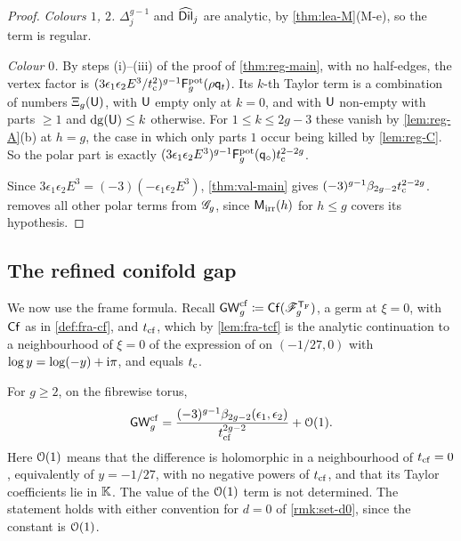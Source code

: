 \begin{proof}
\emph{Colours $1$, $2$.} $\Delta_j^{g-1}$ and $\widehat{\mathsf{Dil}}_j$ are analytic, by \cref{thm:lea-M}(M-e), so the term is regular.

\emph{Colour $0$.} By steps (i)--(iii) of the proof of \cref{thm:reg-main}, with no half-edges, the vertex factor is $(3\epsilon_1\epsilon_2E^3/t_{\mathrm{c}}^2)^{g-1}\mathsf{F}^{\mathrm{pot}}_g(\rho\mathsf{q}_{t})$. Its $k$-th Taylor term is a combination of numbers $\Xi_g(\mathsf{U})$, with $\mathsf{U}$ empty only at $k=0$, and with $\mathsf{U}$ non-empty with parts $\geq 1$ and $\mathrm{dg}(\mathsf{U})\leq k$ otherwise. For $1\leq k\leq 2g-3$ these vanish by \cref{lem:reg-A}(b) at $h=g$, the case in which only parts $1$ occur being killed by \cref{lem:reg-C}. So the polar part is exactly $(3\epsilon_1\epsilon_2E^3)^{g-1}\mathsf{F}^{\mathrm{pot}}_g(\mathsf{q}_{\circ})t_{\mathrm{c}}^{2-2g}$.

Since $3\epsilon_1\epsilon_2E^3=(-3)(-\epsilon_1\epsilon_2E^3)$, \cref{thm:val-main} gives $(-3)^{g-1}\beta_{2g-2}t_{\mathrm{c}}^{2-2g}$.  removes all other polar terms from $\mathscr{G}_g$, since $\mathsf{M}_{\mathrm{irr}}(h)$ for $h\leq g$ covers its hypothesis.
\end{proof}

\subsection{The refined conifold gap}
\label{sec:reg-gap}

We now use the frame formula. Recall $\mathsf{GW}^{\mathrm{cf}}_g\coloneqq\mathsf{Cf}(\mathscr{F}_g^{\mathsf{T}_{\mathrm{F}}})$, a germ at $\xi=0$, with $\mathsf{Cf}$ as in \cref{def:fra-cf}, and $t_{\mathrm{cf}}$, which by \cref{lem:fra-tcf} is the analytic continuation to a neighbourhood of $\xi=0$ of the expression of \cite{BS} on $(-1/27,0)$ with $\log y=\log(-y)+\mathrm{i}\pi$, and equals $t_{\mathrm{c}}$. 

\begin{cor}
\label{cor:reg-gap}
For $g\geq 2$, on the fibrewise torus,
\[
\mathsf{GW}^{\mathrm{cf}}_g=\frac{(-3)^{g-1}\beta_{2g-2}(\epsilon_1,\epsilon_2)}{t_{\mathrm{cf}}^{2g-2}}+\mathcal{O}(1).
\]
Here $\mathcal{O}(1)$ means that the difference is holomorphic in a neighbourhood of $t_{\mathrm{cf}}=0$, equivalently of $y=-1/27$, with no negative powers of $t_{\mathrm{cf}}$, and that its Taylor coefficients lie in $\mathbb{K}$. The value of the $\mathcal{O}(1)$ term is not determined. The statement holds with either convention for $d=0$ of \cref{rmk:set-d0}, since the constant is $\mathcal{O}(1)$.
\end{cor}

